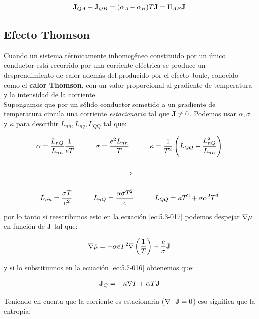 \documentclass[12pt]{book}
\begin{document}
\begin{equation}
\textbf{J}_{QA} - \textbf{J}_{QB} = (\alpha_A - \alpha_B) T \textbf{J} = \Pi_{AB} \textbf{J}
\end{equation}


\subsection{Efecto Thomson}

Cuando un sistema térmicamente inhomogéneo constituido por un único conductor está recorrido por una corriente eléctrica se produce un desprendimiento de calor además del producido por el efecto Joule, conocido como el \textbf{calor Thomson}, con un valor proporcional al gradiente de temperatura y la intensidad de la corriente. \\

Supongamos que por un sólido conductor sometido a un gradiente de temperatura circula una corriente \textit{estacionaria} tal que $\textbf{J} \neq 0$. Podemos usar $\alpha, \sigma$ y $\kappa$ para describir $L_{nn}, L_{nq}, L_{QQ}$ tal que:

\begin{equation}
\alpha = \dfrac{L_{nQ}}{L_{nn}}
 \dfrac{1}{e T} \quad \quad \quad
\sigma = \dfrac{e^2 L_{nn}}{T} \quad \quad \quad
\kappa = \dfrac{1}{T^2} \left( L_{QQ} - \dfrac{L_{nQ}^2}{L_{nn}} \right) 
\end{equation} \\
$$ \Longrightarrow $$ \\
\begin{equation}
L_{nn} = \dfrac{\sigma T }{e^2}  \quad \quad \quad
L_{nQ} =  \dfrac{\alpha \sigma T^2  }{e} \quad \quad \quad
L_{QQ} =  \kappa T^2 + \sigma \alpha^2 T^3
\end{equation}

por lo tanto si reescribimos esto en la ecuación \ref{ec:5.3-017} podemos despejar $\nabla \bar{\mu}$ en función de $\textbf{J}$ tal que:

\begin{equation}
\nabla \bar{\mu} = - \alpha e T^2 \nabla \left( \dfrac{1}{T} \right) + \dfrac{e}{\sigma} \textbf{J}
\end{equation}

y si lo substituimos en la ecuación \ref{ec:5.3-016} obtenemos que:

\begin{equation}
\textbf{J}_Q = - \kappa \nabla T  + \alpha T \textbf{J}
\end{equation}

Teniendo en cuenta que la corriente es estacionaria ($\nabla \cdot \textbf{J} = 0$) eso significa que la entropía:
\end{document}
